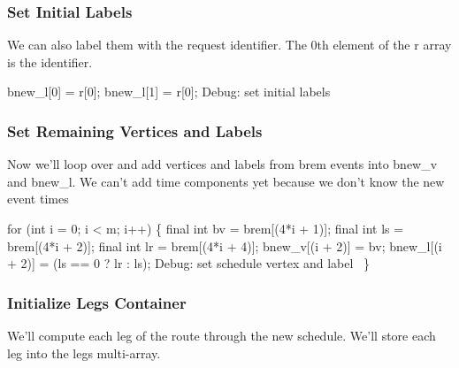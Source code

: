 \subsubsection{Set Initial Labels}

We can also label them with the request identifier. The 0th element of the
{\Tt{}r\nwendquote} array is the identifier.

\nwenddocs{}\endmoddef\nwstartdeflinemarkup{}\nwenddeflinemarkup
bnew_l[0] = r[0];
bnew_l[1] = r[0];
\LA{}Debug: set initial labels~{\nwtagstyle{}}\RA{}
\nwendcode{}\nwdocspar

\subsubsection{Set Remaining Vertices and Labels}

Now we'll loop over and add vertices and labels from {\Tt{}brem\nwendquote} events into
{\Tt{}bnew{\_}v\nwendquote} and {\Tt{}bnew{\_}l\nwendquote}. We can't add time components yet because we
don't know the new event times

\nwenddocs{}\endmoddef\nwstartdeflinemarkup{}\nwenddeflinemarkup
for (int i = 0; i < m; i++) \{
  final int bv = brem[(4*i + 1)];
  final int ls = brem[(4*i + 2)];
  final int lr = brem[(4*i + 4)];
  bnew_v[(i + 2)] = bv;
  bnew_l[(i + 2)] = (ls == 0 ? lr : ls);
  \LA{}Debug: set schedule vertex and label~{\nwtagstyle{}}\RA{}
\}
\nwendcode{}\nwdocspar

\subsubsection{Initialize Legs Container}

We'll compute each leg of the route through the new schedule. We'll store
each leg into the {\Tt{}legs\nwendquote} multi-array.

